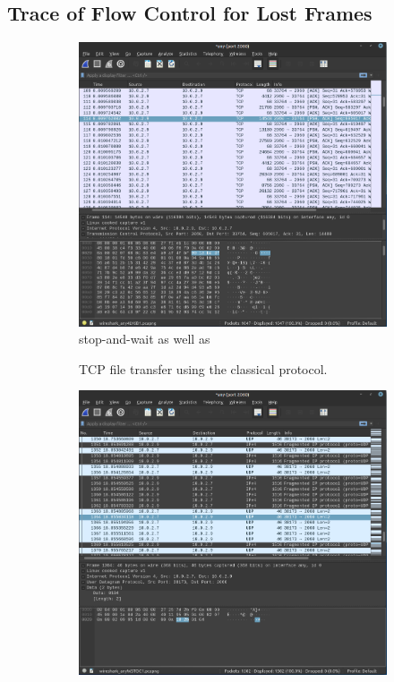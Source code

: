 \documentclass[runningheads]{llncs}
\begin{document}
\subsection{Trace of Flow Control for Lost Frames}
\begin{figure}[htp]
\centering
\begin{subfigure}{0.32\linewidth}
  \centering
  \includegraphics[width=1\linewidth]{Figures/TCP_packet_capture.png}
 stop-and-wait as well as  \caption{TCP file transfer using the classical protocol.\vspace{55pt}}
  \label{fig:tcp}
\end{subfigure}
\begin{subfigure}{0.32\linewidth}
  \centering
  \includegraphics[width=1\linewidth]{Figures/UDP2_packet_capture.png}

\end{subfigure}
\end{figure}
\end{document}

